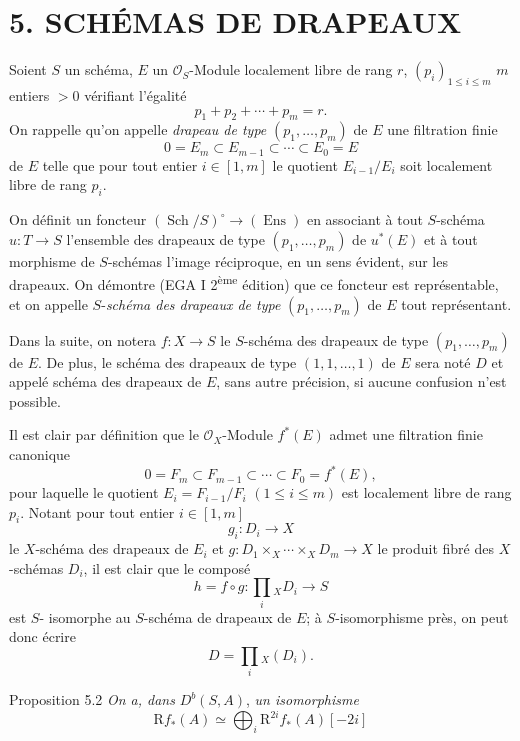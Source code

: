 \section*{5. SCHÉMAS DE DRAPEAUX}

Soient $S$ un schéma, $E$ un $\mathcal{O}_S$-Module localement libre de rang $r$, $(p_i)_{1\le i\le m}$ $m$ entiers $>0$ vérifiant l'égalité
\[
p_1+p_2+\cdots+p_m=r.
\]
On rappelle qu'on appelle \emph{drapeau de type} $(p_1,\ldots,p_m)$ de $E$ une filtration finie
\[
0=E_m\subset E_{m-1}\subset\cdots\subset E_0=E
\]
de $E$ telle que pour tout entier $i\in[1,m]$ le quotient $E_{i-1}/E_i$ soit localement libre de rang $p_i$.

On définit un foncteur $(\operatorname{Sch}/S)^\circ\to(\operatorname{Ens})$ en associant à tout $S$-schéma $u:T\to S$ l'ensemble des drapeaux de type $(p_1,\ldots,p_m)$ de $u^*(E)$ et à tout morphisme de $S$-schémas l'image réciproque, en un sens évident, sur les drapeaux. On démontre (EGA I 2\textsuperscript{ème} édition) que ce foncteur est représentable, et on appelle $S$-\emph{schéma des drapeaux de type} $(p_1,\ldots,p_m)$ de $E$ tout représentant.

Dans la suite, on notera $f:X\to S$ le $S$-schéma des drapeaux de type $(p_1,\ldots,p_m)$ de $E$. De plus, le schéma des drapeaux de type $(1,1,\ldots,1)$ de $E$ sera noté $D$ et appelé schéma des drapeaux de $E$, sans autre précision, si aucune confusion n'est possible.

Il est clair par définition que le $\mathcal{O}_X$-Module $f^*(E)$ admet une filtration finie canonique
\[
0=F_m\subset F_{m-1}\subset\cdots\subset F_0=f^*(E),
\]
pour laquelle le quotient $E_i=F_{i-1}/F_i$ $(1\le i\le m)$ est localement libre de rang $p_i$. Notant pour tout entier $i\in[1,m]$
\[
g_i:D_i\to X
\]
le $X$-schéma des drapeaux de $E_i$ et $g:D_1\times_X\cdots\times_X D_m\to X$ le produit fibré des $X$-schémas $D_i$, il est clair que le composé
\[
h=f\circ g:\prod_i{}_XD_i\to S
\tag{5.1}
\]
est $S$-
isomorphe au $S$-schéma de drapeaux de $E$; à $S$-isomorphisme près, on peut donc écrire
\[
D=\prod_i{}_X(D_i).
\]

\begin{statement}{Proposition 5.2}
\emph{On a, dans} $D^b(S,A)$, \emph{un isomorphisme}
\[
\mathrm{R} f_*(A)\simeq\bigoplus_i \mathrm{R}^{2i}f_*(A)[-2i]
\]
\end{statement}

